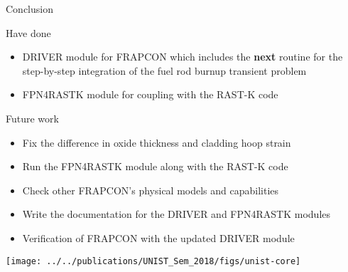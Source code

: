 \documentclass[11pt]{beamer}
\begin{document}
\begin{frame}{Conclusion}
  \footnotesize 

  \begin{block}{Have done}
  \begin{itemize}
  \item DRIVER module for FRAPCON which includes the \textbf{next} routine for the step-by-step integration of the fuel rod burnup transient problem
  \item FPN4RASTK module for coupling with the RAST-K code
  \end{itemize}
  \end{block}
  
  \begin{block}{Future work}
  \begin{itemize}
  \item Fix the difference in oxide thickness and cladding hoop strain
  \item Run the FPN4RASTK module along with the RAST-K code
  \item Check other FRAPCON's physical models and capabilities
  \item Write the documentation for the DRIVER and FPN4RASTK modules 
  \item Verification of FRAPCON with the updated DRIVER module
  \end{itemize}
  \end{block}

\end{frame}

\begin{frame}{}
 \Huge
 \center
 \texttt{[image: ../../publications/UNIST\_Sem\_2018/figs/unist-core]}
\end{frame}
\end{document}
